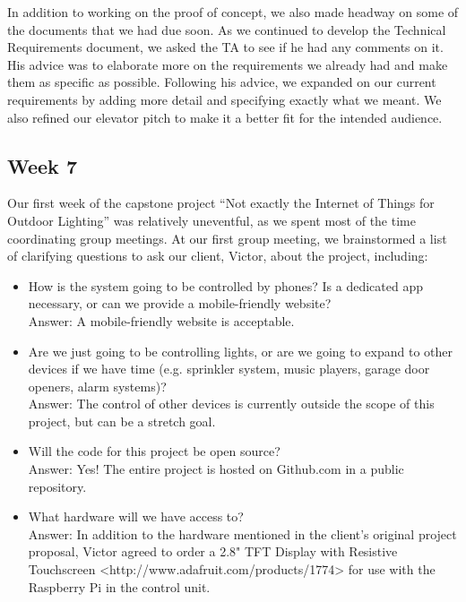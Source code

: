 \documentclass[letterpaper,10pt]{article}
\begin{document}
In addition to working on the proof of concept, we also made headway on some of the documents that we had due soon. As we continued to develop the Technical Requirements document, we asked the TA to see if he had any comments on it. His advice was to elaborate more on the requirements we already had and make them as specific as possible. Following his advice, we expanded on our current requirements by adding more detail and specifying exactly what we meant. We also refined our elevator pitch to make it a better fit for the intended audience.

\subsection{Week 7}  

Our first week of the capstone project ``Not exactly the Internet of Things for
Outdoor Lighting'' was relatively uneventful, as we spent most of the time
coordinating group meetings.  At our first group meeting, we brainstormed a
list of clarifying questions to ask our client, Victor, about the project,
including:

\begin{itemize}
    \item How is the system going to be controlled by phones?  Is a dedicated
        app necessary, or can we provide a mobile-friendly website?\\ Answer: A
        mobile-friendly website is acceptable.
    \item Are we just going to be controlling lights, or are we going to expand
        to other devices if we have time (e.g. sprinkler system, music players,
        garage door openers, alarm systems)?\\
        Answer: The control of other devices is currently outside the scope of
        this project, but can be a stretch goal.
    \item Will the code for this project be open source?\\
        Answer: Yes!  The entire project is hosted on Github.com in a public
        repository.
    \item What hardware will we have access to?\\
        Answer: In addition to the hardware mentioned in the client's original
        project proposal, Victor agreed to order a 2.8" TFT Display with
        Resistive Touchscreen <http://www.adafruit.com/products/1774> for use
        with the Raspberry Pi in the control unit.
\end{itemize}
\end{document}
